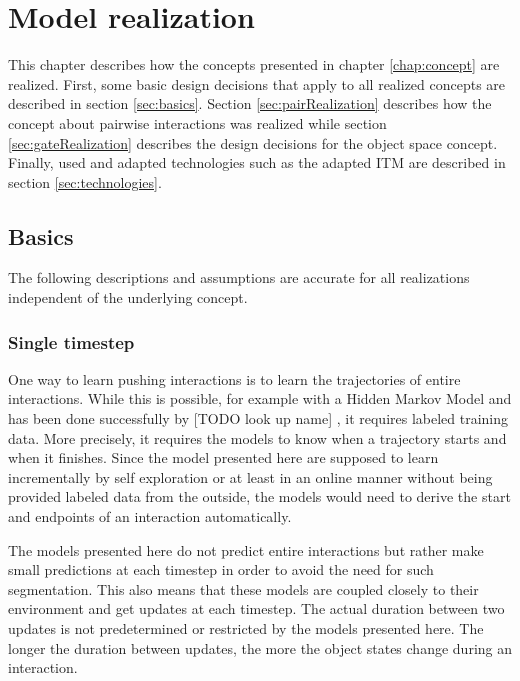 \chapter{Model realization\label{chap:modelReal}}



This chapter describes how the concepts presented in chapter \ref{chap:concept} are realized. 
First, some basic design decisions that apply to all realized concepts are described in section \ref{sec:basics}. Section \ref{sec:pairRealization} describes how the concept about pairwise interactions was realized while section \ref{sec:gateRealization} describes the design decisions for the object space concept.
Finally, used and adapted technologies such as the adapted ITM are described in section \ref{sec:technologies}.

\section{Basics \label{sec:basics}}

The following descriptions and assumptions are accurate for all realizations independent of the underlying concept.

\subsection{Single timestep}

One way to learn pushing interactions is to learn the trajectories of entire interactions. While this is possible, for example with a Hidden Markov Model \cite{hmm} and has been done successfully by [TODO look up name] \cite{hmmTrajectory}, it requires labeled training data. More precisely, it requires the models to know when a trajectory starts and when it finishes. Since the model presented here are supposed to learn incrementally by self exploration or at least in an online manner without being provided labeled data from the outside, the models would need to derive the start and endpoints of an interaction automatically. 

The models presented here do not predict entire interactions but rather make small predictions at each timestep in order to avoid the need for such segmentation. This also means that these models are coupled closely to their environment and get updates at each timestep. The actual duration between two updates is not predetermined or restricted by the models presented here. The longer the duration between updates, the more the object states change during an interaction. 

